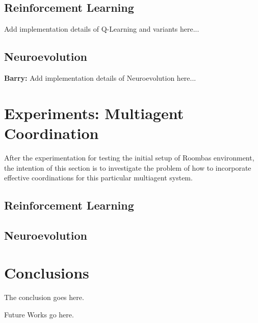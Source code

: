\documentclass[conference]{IEEEtran}
\begin{document}
\subsection{Reinforcement Learning}
Add implementation details of Q-Learning and variants here...

\subsection{Neuroevolution}
\textbf{Barry:}
Add implementation details of Neuroevolution here...

\section{Experiments: Multiagent Coordination}
After the experimentation for testing the initial setup of Roombas
environment, the intention of this section is to investigate the problem of
how to incorporate effective coordinations for this particular multiagent
system.
\subsection{Reinforcement Learning}

\subsection{Neuroevolution}




\section{Conclusions} \label{conclusion}
The conclusion goes here. 

Future Works go here.



\end{document}

